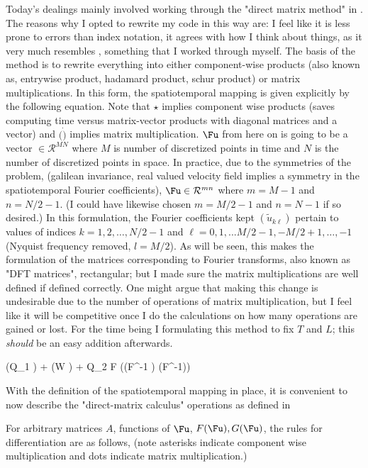 Today's dealings mainly involved working through the "direct matrix method" in .
The reasons why I opted to rewrite my code in this way are: I feel like it is less
prone to errors than index notation, it agrees with how I think about things, as it
very much resembles , something that I worked through myself.
The basis of the method is to rewrite everything into either component-wise products
(also known as, entrywise product, hadamard product,
schur product)  or matrix multiplications. In this form, the spatiotemporal mapping is given explicitly
by the following equation. Note that $\star$ implies component wise products (saves computing time versus
matrix-vector products with diagonal matrices and a vector) and $(\dot)$ implies matrix multiplication. $\Fu$
from here on is going to be a vector $\in \mathcal{R}^{MN}$ where $M$ is number of discretized points in time and $N$ is
the number of discretized points in space. In practice, due to the symmetries of the problem, (galilean invariance, real valued
velocity field implies a symmetry in the spatiotemporal Fourier coefficients), $\Fu \in \mathcal{R}^{mn}$ where
$m = M-1$ and $n = N/2 - 1 $. (I could have likewise chosen $m = M/2 -1$ and $n = N-1$ if so desired.) In this formulation,
the Fourier coefficients kept $(\tilde{u}_{k \ell})$ pertain to values of indices $k = 1, 2, \ldots, N/2-1$ and $\ell = 0,1, ...
M/2-1, -M/2+1, \ldots, -1$ (Nyquist frequency removed, $l = M/2$).
As will be seen, this makes the formulation of the matrices corresponding to Fourier transforms, also known as "DFT matrices",
rectangular; but I made sure the matrix multiplications are well defined if defined correctly. One might argue that making
this change is undesirable due to the number of operations of matrix multiplication, but I feel like it will be competitive
once I do the calculations on how many operations are gained or lost.
For the time being I formulating this method to fix $T$ and $L$; this \emph{should} be
an easy addition afterwards.

\beq \label{e-FksMatrix}
(Q_1 \star \Fu) + (W \dot \Fu) + Q_2 \dot F \dot ((F^{-1} \dot \Fu) \star (F^{-1}\dot \Fu))
\eeq

With the definition of the spatiotemporal mapping in place, it is convenient to now describe the "direct-matrix calculus"
operations as defined in 

For arbitrary matrices $A$, functions of $\Fu$, $F(\Fu), G(\Fu)$, the rules for differentiation are as follows,
(note asterisks indicate component wise multiplication and dots indicate matrix multiplication.)

